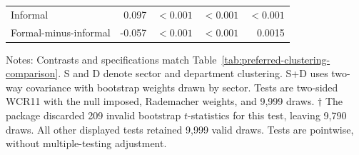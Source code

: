 \begin{table}[htbp]
\begin{tabular}{@{}p{}rrrr@{}}
    Informal & 0.097 & $<0.001$ & $<0.001$ & $<0.001$ \\
    Formal-minus-informal & -0.057 & $<0.001$ & $<0.001$ & 0.0015 \\
    \bottomrule
  \end{tabular}
  \vspace{0.3em}
  \begin{minipage}{0.98\textwidth}
    \footnotesize
    Notes: Contrasts and specifications match Table~\ref{tab:preferred-clustering-comparison}. S and D denote sector and department clustering. S+D uses two-way covariance with bootstrap weights drawn by sector. Tests are two-sided WCR11 with the null imposed, Rademacher weights, and 9,999 draws. $\dagger$ The package discarded 209 invalid bootstrap $t$-statistics for this test, leaving 9,790 draws. All other displayed tests retained 9,999 valid draws. Tests are pointwise, without multiple-testing adjustment.
  \end{minipage}
\end{table}
